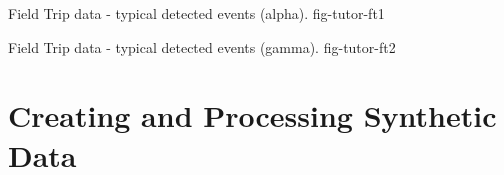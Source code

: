 {Field Trip data - typical detected events (alpha).}
{fig-tutor-ft1}

{Field Trip data - typical detected events (gamma).}
{fig-tutor-ft2}

%
%
\clearpage

\clearpage

%
%
%
\section{Creating and Processing Synthetic Data}
\label{sect-tutor-synth}

